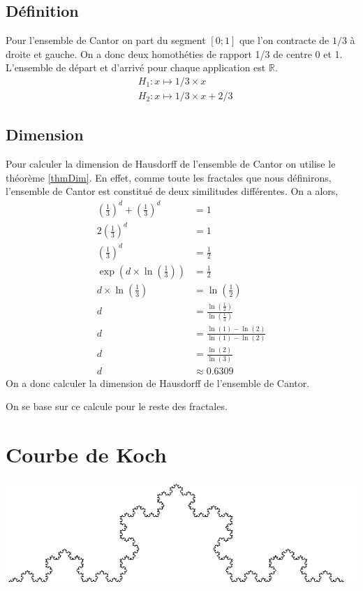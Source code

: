 \documentclass[a4paper, 12pt]{report}
\begin{document}
			\subsection{Définition}
				Pour l'ensemble de Cantor on part du segment $[0;1]$ que l'on contracte de $1/3$ à droite et gauche.
				On a donc deux homothéties de rapport 1/3 de centre 0 et 1. L'ensemble de départ et d'arrivé pour chaque application est $\mathds{R}.$ 
				\begin{align*}
					&H_1:x\mapsto 1/3\times x\\
					&H_2:x\mapsto 1/3\times x+2/3
				\end{align*}
			\subsection{Dimension}
				Pour calculer la dimension de Hausdorff de l'ensemble de Cantor on utilise le théorème \ref{thmDim}. En effet, comme toute les fractales que nous définirons, l'ensemble de Cantor est constitué de deux similitudes différentes. On a alors,
				\begin{align*}
					\left(\frac{1}{3}\right)^d+\left(\frac{1}{3}\right)^d	&=1\\
											  2\left(\frac{1}{3}\right)^d	&=1\\
											   \left(\frac{1}{3}\right)^d	&=\frac{1}{2}\\
						\exp\left(d\times\ln\left(\frac{1}{3}\right)\right)	&=\frac{1}{2} \tag{Passage à la forme exponentielle}\\
										d\times\ln\left(\frac{1}{3}\right)	&=\ln\left(\frac{1}{2}\right)\\
																		d	&=\frac{\ln\left(\frac{1}{2}\right)}{\ln\left(\frac{1}{3}\right)}\\
																		d	&=\frac{\ln(1)-\ln(2)}{\ln(1)-\ln(2)}\\
																		d	&=\frac{\ln(2)}{\ln(3)} \tag{$\ln(1)$=0}\\
																		d	&\approx 0.6309
				\end{align*}
				On a donc calculer la dimension de Hausdorff de l'ensemble de Cantor.
				
				
				On se base sur ce calcule pour le reste des fractales.
\newpage
		\section{Courbe de Koch}
			\includegraphics[scale=0.9]{Images/courbe}
\end{document}
